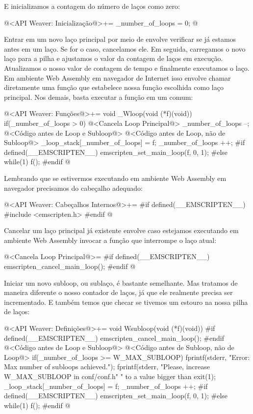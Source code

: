 E inicializamos a contagem do número de laços como zero:

\iniciocodigo
@<API Weaver: Inicialização@>+=
_number_of_loops = 0;
@
\fimcodigo

Entrar em um novo laço principal por meio de 
envolve verificar se já estamos antes em um laço. Se for o caso,
cancelamos ele. Em seguida, carregamos o novo laço para a pilha e
ajustamos o valor da contagem de laços em execução. Atualizamos o
nosso valor de contagem de tempo e finalmente executamos o laço. Em
ambiente Web Assembly em navegador de Internet isso envolve chamar
diretamente uma função que estabelece nossa função escolhida como laço
principal. Nos demais, basta executar a função em
um  comum:

\iniciocodigo
@<API Weaver: Funções@>+=
void _Wloop(void (*f)(void)){
  if(_number_of_loops > 0){
    @<Cancela Loop Principal@>
    _number_of_loops --;
  }
  @<Código antes de Loop e Subloop@>
  @<Código antes de Loop, não de Subloop@>
  _loop_stack[_number_of_loops] = f;
  _number_of_loops ++;
#if defined(__EMSCRIPTEN__)
  emscripten_set_main_loop(f, 0, 1);
#else
  while(1)
    f();
#endif
}
@
\fimcodigo

Lembrando que se estivermos executando em ambiente Web Assembly em
navegador precisamos do cabeçalho adequado:

\iniciocodigo
@<API Weaver: Cabeçalhos Internos@>+=
#if defined(__EMSCRIPTEN__)
#include <emscripten.h>
#endif
@
\fimcodigo

Cancelar um laço principal já existente envolve caso estejamos
executando em ambiente Web Assembly invocar a função que interrompe o
laço atual:

\iniciocodigo
@<Cancela Loop Principal@>=
#if defined(__EMSCRIPTEN__)
emscripten_cancel_main_loop();
#endif
@
\fimcodigo

Iniciar um novo subloop, ou sublaço, é bastante semelhante. Mas
tratamos de maneira diferente o nosso contador de laços, já que ele
realmente precisa ser incrementado. E também temos que checar se
tivemos um estouro na nossa pilha de laços:

\iniciocodigo
@<API Weaver: Definições@>+=
void Wsubloop(void (*f)(void)){
#if defined(__EMSCRIPTEN__)
    emscripten_cancel_main_loop();
#endif
  @<Código antes de Loop e Subloop@>
  @<Código antes de Subloop, não de Loop@>
  if(_number_of_loops >= W_MAX_SUBLOOP){
    fprintf(stderr, "Error: Max number of subloops achieved.\n");
    fprintf(stderr, "Please, increase W_MAX_SUBLOOP in conf/conf.h"
            " to a value bigger than %
    exit(1);
  }
  _loop_stack[_number_of_loops] = f;
  _number_of_loops ++;
#if defined(__EMSCRIPTEN__)
  emscripten_set_main_loop(f, 0, 1);
#else
  while(1)
    f();
#endif
}
@
\fimcodigo

